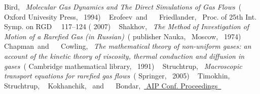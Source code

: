 \documentclass[letterpaper,11pt,oneside,reqno]{amsart}
\numberwithin{equation}{section}
\theoremstyle{definition}
\theoremstyle{qqq}
\begin{document}
\begin{thebibliography}{41}
{{			{Bird}},\ }\href@noop {} {\emph { {Molecular Gas Dynamics and
				The Direct Simulations of Gas Flows}}}\ ( {Oxford
		Univesity Press},\  {1994})%
	\BibitemOpen
	 { {~\bibnamefont
			{Erofeev}}\ and\  {~\bibnamefont
			{Friedlander}},\ }\href@noop {} { {
			{Proc. of 25th Int. Symp. on RGD}\ }\unskip\  {117--124}
		( {2007})}%
	\BibitemOpen
	 { {\ \bibnamefont
			{Shakhov}},\ }\href@noop {} {\emph { {The Method of
				Investigation of Motion of a Rarefied Gas (in Russian)}}}\ (\bibinfo
	{publisher} {Nauka},\  {Moscow},\ 
	{1974})%
	\BibitemOpen
	 { {~\bibnamefont
			{Chapman}}\ and\  {\ \bibnamefont
			{Cowling}},\ }\href@noop {} {\emph { {The mathematical theory
				of non-uniform gases: an account of the kinetic theory of viscosity, thermal
				conduction and diffusion in gases}}}\ ( {Cambridge
		mathematical library},\  {1991})%
	\BibitemOpen
	 { {~\bibnamefont
			{Struchtrup}},\ }\href@noop {} {\emph { {Macroscopic
				transport equations for rarefied gas flows}}}\ (
	{Springer},\  {2005})%
	\BibitemOpen
	 { {\ \bibnamefont
			{Timokhin}},  {\bibfnamefont {H.}~\bibnamefont
			{Struchtrup}},  {\ \bibnamefont
			{Kokhanchik}}, \ and\ \bibinfo {author} {\ \bibnamefont
			{Bondar}},\ }\href {\doibase 10.1063/1.4967637} {
		{\bibinfo  {journal} {AIP Conf. Proceedings}\ }\textbf {
}}
\end{thebibliography}
\end{document}
